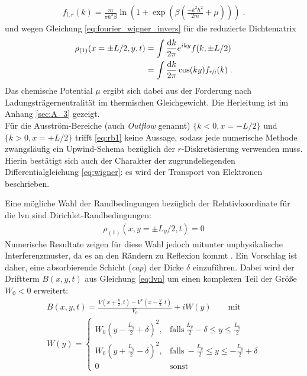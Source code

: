 \begin{align}
  f_{l,r} (k) = \frac{m}{\pi\hbar^2\beta} \ln(1+\exp(\beta(\frac{- k^2\hbar^2}{2m} + \mu))) \; .
  \label{eq:rb2}
\end{align}
und wegen Gleichung \eqref{eq:fourier_wigner_invers} für die reduzierte Dichtematrix
\begin{equation}
  \begin{aligned}
    \rho_{(1)}(x=\pm L/2, y, t) &= \int \frac{\mathop{}\!\mathrm{d} k}{2\pi} e^{iky} f(k,\pm L/2) \\
                                &= \int \frac{\mathop{}\!\mathrm{d} k}{2\pi} \cos(ky) f_{\nicefrac{r}{l}} (k) \; .
  \end{aligned}
  \label{eq:rb4}
\end{equation}
Das chemische Potential $\mu$ ergibt sich dabei aus der Forderung nach Ladungsträgerneutralität im thermischen Gleichgewicht. Die Herleitung ist im Anhang \ref{sec:A_3} gezeigt.\\
Für die Ausström-Bereiche (auch \emph{Outflow} genannt) $\{ k<0, x=-L/2 \}$ und $\{ k>0, x=+L/2 \}$ trifft \eqref{eq:rb1} keine Aussage, sodass jede numerische Methode zwangsläufig ein Upwind-Schema bezüglich der $r$-Diskretisierung verwenden muss. Hierin bestätigt sich auch der Charakter der zugrundeliegenden Differentialgleichung \eqref{eq:wigner}: es wird der Transport von Elektronen beschrieben.

Eine mögliche Wahl der Randbedingungen bezüglich der Relativkoordinate für die \ac{lvn} sind Dirichlet-Randbedingungen:
\begin{equation}
  \begin{aligned}
    \rho_{(1)}(x, y=\pm L_y/2, t) = 0
  \end{aligned}
  \label{eq:rb3}
\end{equation}
Numerische Resultate zeigen für diese Wahl jedoch mitunter unphysikalische Interferenzmuster, da es an den Rändern zu Reflexion kommt \cite{lukas1}. Ein Vorschlag ist daher, eine absorbierende Schicht (\emph{\ac{cap}}) der Dicke $\delta$ einzuführen. Dabei wird der Driftterm $B(x,y,t)$ aus Gleichung \eqref{eq:lvn} um einen komplexen Teil der Größe $W_0<0$ erweitert:
\begin{equation}
  \begin{aligned}
    B(x,y,t) = \frac{V\left(x+\frac{y}{2},t\right) - V^*\left(x-\frac{y}{2},t\right)}{V_0} + iW(y) \qquad \text{mit} \\
  W(y)=
  \begin{cases}
  W_0 \left(y-\frac{L_y}{2}+\delta \right)^2, & \text{falls}~\frac{L_y}{2}-\delta \le y \le \frac{L_y}{2}\\
  W_0 \left(y+\frac{L_y}{2}-\delta \right)^2, & \text{falls}~-\frac{L_y}{2} \le y \le -\frac{L_y}{2}+\delta\\
  0 & \text{sonst}
  \end{cases}
  \end{aligned}
  \label{eq:cap}
\end{equation}

